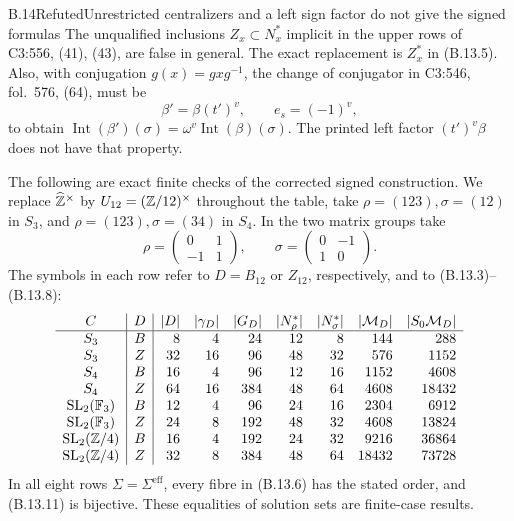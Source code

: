 \begin{statement}{B.14}{Refuted}{Unrestricted centralizers and a left sign factor do not give the signed formulas}
The unqualified inclusions $Z_x\subset N_x^*$ implicit in the upper
rows of C3:556, (41), (43), are false in general. The exact replacement
is $Z_x^*$ in (B.13.5). Also, with conjugation $g(x)=gxg^{-1}$,
the change of conjugator in C3:546, fol.~576, (64), must be
\[
                 \beta'=\beta(t')^v,\qquad e_s=(-1)^v,
                                                        \tag{B.14.1}
\]
to obtain
$\operatorname{Int}(\beta')(\sigma)
 =\omega^v\operatorname{Int}(\beta)(\sigma)$.
The printed left factor $(t')^v\beta$ does not have that property.

The following are exact finite checks of the corrected signed
construction. We replace $\widehat{\mathbb Z}^\times$ by
$U_{12}=(\mathbb Z/12)^\times$ throughout the table, take
$\rho=(123),\sigma=(12)$ in $S_3$, and
$\rho=(123),\sigma=(34)$ in $S_4$. In the two matrix groups take
\[
 \rho=\begin{pmatrix}0&1\\-1&1\end{pmatrix},\qquad
 \sigma=\begin{pmatrix}0&-1\\1&0\end{pmatrix}.
\]
The symbols in each row refer to $D=B_{12}$ or $Z_{12}$,
respectively, and to (B.13.3)--(B.13.8):
\begingroup\small\setlength{\arraycolsep}{4pt}
\[
\begin{array}{c|c|rrrrrrr}
 C&D&|D|&|\gamma_D|&|G_D|&|N_\rho^*|&|N_\sigma^*|
       &|\mathcal M_D|&|S_0\mathcal M_D|\\\hline
 S_3&B&8&4&24&12&8&144&288\\
 S_3&Z&32&16&96&48&32&576&1152\\
 S_4&B&16&4&96&12&16&1152&4608\\
 S_4&Z&64&16&384&48&64&4608&18432\\
 \mathrm{SL}_2(\mathbb F_3)&B&12&4&96&24&16&2304&6912\\
 \mathrm{SL}_2(\mathbb F_3)&Z&24&8&192&48&32&4608&13824\\
 \mathrm{SL}_2(\mathbb Z/4)&B&16&4&192&24&32&9216&36864\\
 \mathrm{SL}_2(\mathbb Z/4)&Z&32&8&384&48&64&18432&73728
\end{array}
\]
\endgroup
In all eight rows $\Sigma=\Sigma^{\mathrm{eff}}$, every fibre
in (B.13.6) has the stated order, and (B.13.11) is bijective.
These equalities of solution sets are finite-case results.
\end{statement}
